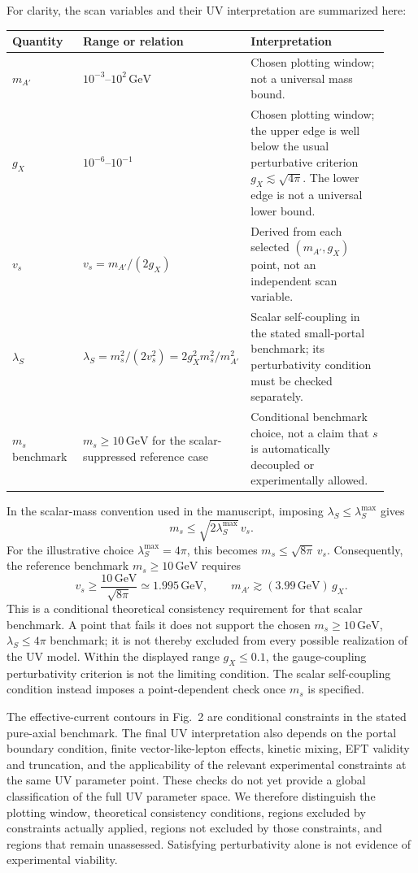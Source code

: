 \documentclass[12pt,a4paper]{article}
\begin{document}
For clarity, the scan variables and their UV interpretation are summarized here:
\begin{center}
\small
\begin{tabular}{p{0.19\linewidth}p{0.34\linewidth}p{0.39\linewidth}}
\hline
Quantity & Range or relation & Interpretation\\
\hline
\(m_{A'}\) & \(10^{-3}\)--\(10^2\,\mathrm{GeV}\) & Chosen plotting window; not a universal mass bound.\\
\(g_X\) & \(10^{-6}\)--\(10^{-1}\) & Chosen plotting window; the upper edge is well below the usual perturbative criterion \(g_X\lesssim\sqrt{4\pi}\). The lower edge is not a universal lower bound.\\
\(v_s\) & \(v_s=m_{A'}/(2g_X)\) & Derived from each selected \((m_{A'},g_X)\) point, not an independent scan variable.\\
\(\lambda_S\) & \(\lambda_S=m_s^2/(2v_s^2)=2g_X^2m_s^2/m_{A'}^2\) & Scalar self-coupling in the stated small-portal benchmark; its perturbativity condition must be checked separately.\\
\(m_s\) benchmark & \(m_s\geq10\,\mathrm{GeV}\) for the scalar-suppressed reference case & Conditional benchmark choice, not a claim that \(s\) is automatically decoupled or experimentally allowed.\\
\hline
\end{tabular}
\end{center}

In the scalar-mass convention used in the manuscript, imposing \(\lambda_S\leq\lambda_S^{\max}\) gives
\[
m_s\leq\sqrt{2\lambda_S^{\max}}\,v_s.
\]
For the illustrative choice \(\lambda_S^{\max}=4\pi\), this becomes \(m_s\leq\sqrt{8\pi}\,v_s\). Consequently, the reference benchmark \(m_s\geq10\,\mathrm{GeV}\) requires
\[
v_s\geq\frac{10\,\mathrm{GeV}}{\sqrt{8\pi}}
\simeq1.995\,\mathrm{GeV},
\qquad
m_{A'}\gtrsim(3.99\,\mathrm{GeV})\,g_X.
\]
This is a conditional theoretical consistency requirement for that scalar benchmark. A point that fails it does not support the chosen \(m_s\geq10\,\mathrm{GeV}\), \(\lambda_S\leq4\pi\) benchmark; it is not thereby excluded from every possible realization of the UV model. Within the displayed range \(g_X\leq0.1\), the gauge-coupling perturbativity criterion is not the limiting condition. The scalar self-coupling condition instead imposes a point-dependent check once \(m_s\) is specified.

The effective-current contours in Fig.~2 are conditional constraints in the stated pure-axial benchmark. The final UV interpretation also depends on the portal boundary condition, finite vector-like-lepton effects, kinetic mixing, EFT validity and truncation, and the applicability of the relevant experimental constraints at the same UV parameter point. These checks do not yet provide a global classification of the full UV parameter space. We therefore distinguish the plotting window, theoretical consistency conditions, regions excluded by constraints actually applied, regions not excluded by those constraints, and regions that remain unassessed. Satisfying perturbativity alone is not evidence of experimental viability.
\end{document}
